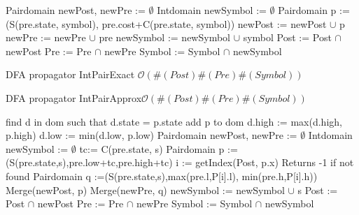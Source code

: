 \begin{algorithm}[H]
\begin{algorithmic}[1]
\State Pairdomain newPost, newPre := $\emptyset$
\State Intdomain newSymbol := $\emptyset$
		\State Pairdomain p := (S(pre.state, symbol), pre.cost+C(pre.state, symbol))
			\State newPost := newPost $\cup$ p
			\State newPre := newPre $\cup$ pre
			\State newSymbol := newSymbol $\cup$ symbol 
		\EndIf
	\EndFor
\EndFor
\State Post := Post $\cap$ newPost
\State Pre := Pre $\cap$ newPre
\State Symbol := Symbol $\cap$ newSymbol
\EndProcedure
\end{algorithmic}
\caption{DFA propagator IntPairExact \newline
 $\mathcal{O}(\#(Post)\#(Pre)\#(Symbol))$}
\label{fig:algexact}
\end{algorithm}
\begin{algorithm}[H]
\label{fig:algapprox}
\caption{DFA propagator IntPairApprox\newline $\mathcal{O}(\#(Post)\#(Pre)\#(Symbol))$}
\begin{algorithmic}[1]
	\State find d in dom such that d.state = p.state
		\State add p to dom
	\Else	
		\State d.high := max(d.high, p.high)
		\State d.low := min(d.low, p.low)
	\EndIf
\EndProcedure
{}
\State Pairdomain newPost, newPre := $\emptyset$
\State Intdomain newSymbol := $\emptyset$
		\State tc:= C(pre.state, s)
		\State Pairdomain p :=(S(pre.state,s),pre.low+tc,pre.high+tc)
		\State i := getIndex(Post, p.x) Returns -1 if not found
		\State Pairdomain q :=(S(pre.state,s),max(pre.l,P[i].l), min(pre.h,P[i].h))
			\State Merge(newPost, p)
			\State Merge(newPre, q)
			\State newSymbol := newSymbol $\cup$ s
		\EndIf
	\EndFor
\EndFor
\State Post := Post $\cap$ newPost
\State Pre := Pre $\cap$ newPre
\State Symbol := Symbol $\cap$ newSymbol
\EndProcedure
\end{algorithmic}
\end{algorithm}
